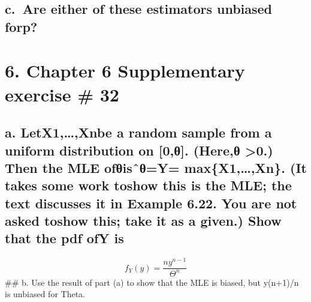 \documentclass[
]{article}
\begin{document}
\hypertarget{c.-are-either-of-these-estimators-unbiased-forp}{%
\subsection{c.~Are either of these estimators unbiased
forp?}\label{c.-are-either-of-these-estimators-unbiased-forp}}

\hypertarget{chapter-6-supplementary-exercise-32}{%
\section{6. Chapter 6 Supplementary exercise \#
32}\label{chapter-6-supplementary-exercise-32}}

\hypertarget{a.-letx1xnbe-a-random-sample-from-a-uniform-distribution-on-0ux3b8.-hereux3b8-0.-then-the-mle-ofux3b8isux2c6ux3b8y-maxx1xn.-it-takes-some-work-toshow-this-is-the-mle-the-text-discusses-it-in-example-6.22.-you-are-not-asked-toshow-this-take-it-as-a-given.-show-that-the-pdf-ofy-is}{%
\subsection{a. LetX1,\ldots,Xnbe a random sample from a uniform
distribution on {[}0,θ{]}. (Here,θ \textgreater0.) Then the MLE
ofθisˆθ=Y= max\{X1,\ldots,Xn\}. (It takes some work toshow this is the
MLE; the text discusses it in Example 6.22. You are not asked toshow
this; take it as a given.) Show that the pdf ofY
is}\label{a.-letx1xnbe-a-random-sample-from-a-uniform-distribution-on-0ux3b8.-hereux3b8-0.-then-the-mle-ofux3b8isux2c6ux3b8y-maxx1xn.-it-takes-some-work-toshow-this-is-the-mle-the-text-discusses-it-in-example-6.22.-you-are-not-asked-toshow-this-take-it-as-a-given.-show-that-the-pdf-ofy-is}}

\[
f_Y(y) = \frac{ny^{n-1}}{\Theta^n}
\] \#\# b. Use the result of part (a) to show that the MLE is biased,
but y(n+1)/n is unbiased for Theta.
\end{document}
